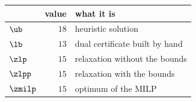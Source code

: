 \begin{center}\small
\begin{tabular}{lrl}
\toprule
 & value & what it is \\
\midrule
$\ub$ & $18$ & heuristic solution \\
$\lb$ & $13$ & dual certificate built by hand \\
$\zlp$ & $15$ & relaxation without the bounds \\
$\zlpp$ & $15$ & relaxation with the bounds \\
$\zmilp$ & $15$ & optimum of the MILP \\
\bottomrule
\end{tabular}
\end{center}
